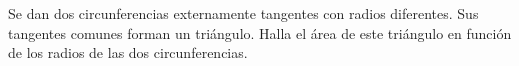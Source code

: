 Se dan dos circunferencias externamente tangentes con radios diferentes. Sus tangentes comunes forman un triángulo. Halla el área de este triángulo en función de los radios de las dos circunferencias.
